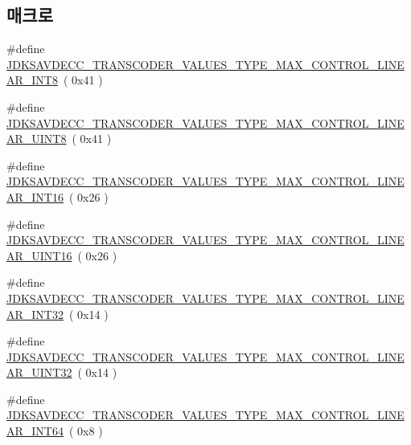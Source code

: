 \subsection*{매크로}
\begin{DoxyCompactItemize}
\item 
\#define \hyperlink{group__transcoder__values__type__max_ga43757e3727ed609b435c6fa90f28bf5c}{J\+D\+K\+S\+A\+V\+D\+E\+C\+C\+\_\+\+T\+R\+A\+N\+S\+C\+O\+D\+E\+R\+\_\+\+V\+A\+L\+U\+E\+S\+\_\+\+T\+Y\+P\+E\+\_\+\+M\+A\+X\+\_\+\+C\+O\+N\+T\+R\+O\+L\+\_\+\+L\+I\+N\+E\+A\+R\+\_\+\+I\+N\+T8}~( 0x41 )
\item 
\#define \hyperlink{group__transcoder__values__type__max_ga62f2dc421d08cc7bf580fc807b2c4969}{J\+D\+K\+S\+A\+V\+D\+E\+C\+C\+\_\+\+T\+R\+A\+N\+S\+C\+O\+D\+E\+R\+\_\+\+V\+A\+L\+U\+E\+S\+\_\+\+T\+Y\+P\+E\+\_\+\+M\+A\+X\+\_\+\+C\+O\+N\+T\+R\+O\+L\+\_\+\+L\+I\+N\+E\+A\+R\+\_\+\+U\+I\+N\+T8}~( 0x41 )
\item 
\#define \hyperlink{group__transcoder__values__type__max_gafbaf5a933c944c4dc404766f478260ba}{J\+D\+K\+S\+A\+V\+D\+E\+C\+C\+\_\+\+T\+R\+A\+N\+S\+C\+O\+D\+E\+R\+\_\+\+V\+A\+L\+U\+E\+S\+\_\+\+T\+Y\+P\+E\+\_\+\+M\+A\+X\+\_\+\+C\+O\+N\+T\+R\+O\+L\+\_\+\+L\+I\+N\+E\+A\+R\+\_\+\+I\+N\+T16}~( 0x26 )
\item 
\#define \hyperlink{group__transcoder__values__type__max_gae29b0dd3b20a9af8bbdb33cd1f4283a9}{J\+D\+K\+S\+A\+V\+D\+E\+C\+C\+\_\+\+T\+R\+A\+N\+S\+C\+O\+D\+E\+R\+\_\+\+V\+A\+L\+U\+E\+S\+\_\+\+T\+Y\+P\+E\+\_\+\+M\+A\+X\+\_\+\+C\+O\+N\+T\+R\+O\+L\+\_\+\+L\+I\+N\+E\+A\+R\+\_\+\+U\+I\+N\+T16}~( 0x26 )
\item 
\#define \hyperlink{group__transcoder__values__type__max_gadfe079f2cb12b575155954623cac08a6}{J\+D\+K\+S\+A\+V\+D\+E\+C\+C\+\_\+\+T\+R\+A\+N\+S\+C\+O\+D\+E\+R\+\_\+\+V\+A\+L\+U\+E\+S\+\_\+\+T\+Y\+P\+E\+\_\+\+M\+A\+X\+\_\+\+C\+O\+N\+T\+R\+O\+L\+\_\+\+L\+I\+N\+E\+A\+R\+\_\+\+I\+N\+T32}~( 0x14 )
\item 
\#define \hyperlink{group__transcoder__values__type__max_ga2fb966e41d117abbf651b64011d846e0}{J\+D\+K\+S\+A\+V\+D\+E\+C\+C\+\_\+\+T\+R\+A\+N\+S\+C\+O\+D\+E\+R\+\_\+\+V\+A\+L\+U\+E\+S\+\_\+\+T\+Y\+P\+E\+\_\+\+M\+A\+X\+\_\+\+C\+O\+N\+T\+R\+O\+L\+\_\+\+L\+I\+N\+E\+A\+R\+\_\+\+U\+I\+N\+T32}~( 0x14 )
\item 
\#define \hyperlink{group__transcoder__values__type__max_ga7cd1594ab101a6a375eaceda67ec5d27}{J\+D\+K\+S\+A\+V\+D\+E\+C\+C\+\_\+\+T\+R\+A\+N\+S\+C\+O\+D\+E\+R\+\_\+\+V\+A\+L\+U\+E\+S\+\_\+\+T\+Y\+P\+E\+\_\+\+M\+A\+X\+\_\+\+C\+O\+N\+T\+R\+O\+L\+\_\+\+L\+I\+N\+E\+A\+R\+\_\+\+I\+N\+T64}~( 0x8 )

\end{DoxyCompactItemize}
